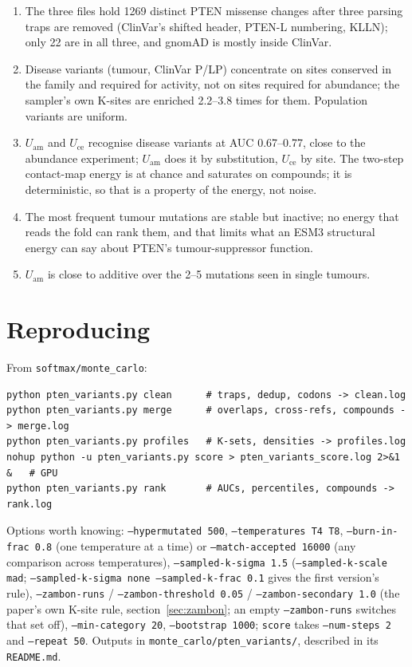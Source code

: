 \documentclass[11pt,a4paper]{article}
\newcommand{\file}[1]{\texttt{#1}}
\newcommand{\Uam}{U_{\mathrm{am}}}
\newcommand{\Uce}{U_{\mathrm{ce}}}
\begin{document}
\begin{enumerate}
\item The three files hold 1269 distinct PTEN missense changes after three
  parsing traps are removed (ClinVar's shifted header, PTEN-L numbering, KLLN);
  only 22 are in all three, and gnomAD is mostly inside ClinVar.
\item Disease variants (tumour, ClinVar P/LP) concentrate on sites conserved
  in the family and required for activity, not on sites required for
  abundance; the sampler's own K-sites are enriched 2.2--3.8 times for them.
  Population variants are uniform.
\item $\Uam$ and $\Uce$ recognise disease variants at AUC 0.67--0.77, close to
  the abundance experiment; $\Uam$ does it by substitution, $\Uce$ by site. The
  two-step contact-map energy is at chance and saturates on compounds; it is
  deterministic, so that is a property of the energy, not noise.
\item The most frequent tumour mutations are stable but inactive; no energy
  that reads the fold can rank them, and that limits what an ESM3 structural
  energy can say about PTEN's tumour-suppressor function.
\item $\Uam$ is close to additive over the 2--5 mutations seen in single
  tumours.
\end{enumerate}

\appendix
\section{Reproducing}

From \file{softmax/monte\_carlo}:
\begin{verbatim}
python pten_variants.py clean      # traps, dedup, codons -> clean.log
python pten_variants.py merge      # overlaps, cross-refs, compounds -> merge.log
python pten_variants.py profiles   # K-sets, densities -> profiles.log
nohup python -u pten_variants.py score > pten_variants_score.log 2>&1 &   # GPU
python pten_variants.py rank       # AUCs, percentiles, compounds -> rank.log
\end{verbatim}
Options worth knowing: \texttt{--hypermutated 500}, \texttt{--temperatures T4
T8}, \texttt{--burn-in-frac 0.8} (one temperature at a time) or
\texttt{--match-accepted 16000} (any comparison across temperatures),
\texttt{--sampled-k-sigma 1.5}
(\texttt{--sampled-k-scale mad}; \texttt{--sampled-k-sigma none
--sampled-k-frac 0.1} gives the first version's rule),
\texttt{--zambon-runs} / \texttt{--zambon-threshold 0.05} /
\texttt{--zambon-secondary 1.0} (the paper's own K-site rule,
section~\ref{sec:zambon}; an empty \texttt{--zambon-runs} switches that set off),
\texttt{--min-category 20}, \texttt{--bootstrap 1000}; \texttt{score} takes
\texttt{--num-steps 2} and \texttt{--repeat 50}. Outputs in
\file{monte\_carlo/pten\_variants/}, described in its \file{README.md}.
\end{document}
